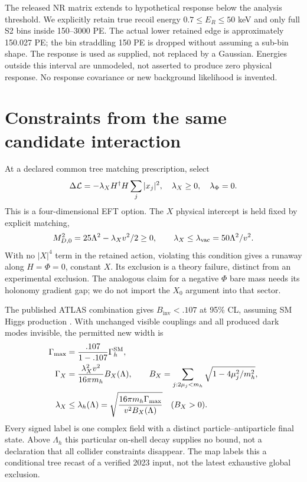 \documentclass[11pt,a4paper]{article}
\begin{document}
The released NR matrix extends to hypothetical response below the
analysis threshold. We explicitly retain true recoil energy
$0.7\leq E_R\leq50$ keV and only full S2 bins inside 150--3000 PE.
The actual lower retained edge is approximately 150.027 PE; the bin
straddling 150 PE is dropped without assuming a sub-bin shape.
The response is used as supplied, not replaced by a Gaussian. Energies
outside this interval are unmodeled, not asserted to produce zero
physical response. No response covariance or new background likelihood
is invented.

\section{Constraints from the same candidate interaction}
At a declared common tree matching prescription, select
\begin{equation}
 \Delta{\cal L}=-\lambda_X H^\dagger H\sum_j|x_j|^2,
 \quad \lambda_X\geq0,\quad \lambda_\Phi=0.
\end{equation}
This is a four-dimensional EFT option. The $X$ physical intercept is
held fixed by explicit matching,
\begin{equation}\label{eq:vacuum}
 M_{D,0}^2=25\Lambda^2-\lambda_Xv^2/2\geq0,
 \qquad\lambda_X\leq\lambda_{\rm vac}=50\Lambda^2/v^2 .
\end{equation}
With no $|X|^4$ term in the retained action, violating this condition
gives a runaway along $H=\Phi=0$, constant $X$. Its exclusion is a
theory failure, distinct from an experimental exclusion. The analogous
claim for a negative $\Phi$ bare mass needs its holonomy gradient gap;
we do not import the $X_0$ argument into that sector.

The published ATLAS combination gives $B_{\mathrm{inv}}<.107$ at 95\% CL,
assuming SM Higgs production \cite{atlas}. With unchanged visible
couplings and all produced dark modes invisible, the permitted new
width is
\begin{align}
 \Gamma_{\max}&=\frac{.107}{1-.107}\Gamma_h^{\rm SM},\\
 \Gamma_X&=\frac{\lambda_X^2v^2}{16\pi m_h}B_X(\Lambda),\qquad
 B_X=\sum_{j:2\mu_j<m_h}\sqrt{1-4\mu_j^2/m_h^2},\\
 \lambda_X&\leq\lambda_h(\Lambda)
 =\sqrt{\frac{16\pi m_h\Gamma_{\max}}{v^2B_X(\Lambda)}}
 \quad(B_X>0).
\end{align}
Every signed label is one complex field with a distinct
particle--antiparticle final state. Above $\Lambda_h$ this particular
on-shell decay supplies no bound, not a declaration that all collider
constraints disappear. The map labels this a conditional tree recast
of a verified 2023 input, not the latest exhaustive global exclusion.
\end{document}
